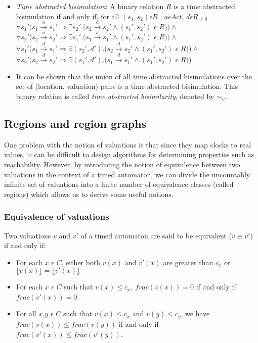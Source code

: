 \documentclass{article}
\begin{document}
  \begin{itemize}
    
  \item \emph{Time abstracted bisimulation}: A binary relation $R$ is
    a time abstracted
    bisimulation if and only if, for all $(s_1, s_2) \epsilon R$ , $a \epsilon Act $, $d \epsilon R_{\ge 0}$\\
    $\forall s_1' (s_1 \xrightarrow{a} s_1' \Rightarrow \exists s_2'
    . (s_2 \xrightarrow{a} s_2' \wedge (s_1', s_2')$ $\epsilon$ $R ) )
    \wedge $ \\
    $\forall s_2' (s_2 \xrightarrow{a} s_2' \Rightarrow \exists s_1'
    . (s_1 \xrightarrow{a} s_1' \wedge (s_1', s_2')$ $\epsilon$ $R ) ) \wedge $ \\
    $\forall s_1' (s_1 \xrightarrow{d} s_1' \Rightarrow \exists (s_2',
    d')
    . (s_2 \xrightarrow{d} s_2' \wedge (s_1', s_2')$ $\epsilon$ $R ) )
    \wedge $ \\
    $\forall s_2' (s_2 \xrightarrow{d} s_2' \Rightarrow \exists (s_1', d')
    . (s_1 \xrightarrow{d} s_1' \wedge (s_1', s_2')$ $\epsilon$ $R ) ) $ \\

  \item It can be shown that the union of all time abstracted bisimulations
    over the set of (location, valuation) pairs is a time abstracted bisimulation. This binary
    relation is called \textit{time abstracted bisimilarity}, denoted by $\sim_u$.
    

\end{itemize}

\subsection{Regions and region graphs}

One problem with the notion of valuations is that since they map
clocks to real values, it can be difficult to design algorithms for
determining properties such as
reachability. However, by introducing the notion of equivalence
between two valuations in the context of a timed automaton, we can
divide the uncountably infinite set of valuations into a finite number
of equivalence classes (called regions) which allows us to derive some
useful notions.

\subsubsection{Equivalence of valuations}
Two valuations $v$ and $v'$ of
a timed automaton are said to be equivalent ($v \equiv v'$) if and
only if:
\begin{itemize}
\item For each $x$ $\epsilon$ $C$, either both $v(x)$ and $v'(x)$ are
  greater than $c_x$ or $\lfloor v(x) \rfloor = \lfloor v'(x)
  \rfloor$
\item For each $x$ $\epsilon$ $C$ such that $v(x) \le c_x$,
  $frac(v(x))=0$ if and only if $frac(v'(x))=0$.
\item For all $x$,$y$ $\epsilon$ $C$ such that $v(x) \le c_x$ and $v(y)
  \le c_y$, we have $frac(v(x)) \le frac(v(y))$ if and only if
  $frac(v'(x)) \le frac(v'(y))$.
\end{itemize}
\end{document}
